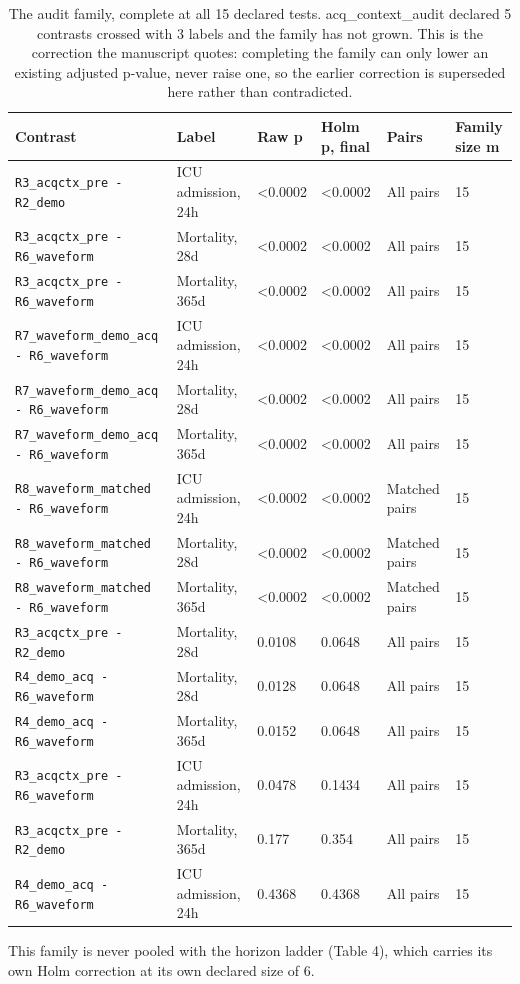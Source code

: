 \begin{table}[t]
\centering
\small
\caption{The audit family, complete at all 15 declared tests. acq\_context\_audit declared 5 contrasts crossed with 3 labels and the family has not grown. This is the correction the manuscript quotes: completing the family can only lower an existing adjusted p-value, never raise one, so the earlier correction is superseded here rather than contradicted.}
\label{tab:family}
\begin{tabular}{llllll}
\toprule
Contrast & Label & Raw p & Holm p, final & Pairs & Family size m \\
\midrule
\texttt{R3\_acqctx\_pre - R2\_demo} & ICU admission, 24h & <0.0002 & <0.0002 & All pairs & 15 \\
\texttt{R3\_acqctx\_pre - R6\_waveform} & Mortality, 28d & <0.0002 & <0.0002 & All pairs & 15 \\
\texttt{R3\_acqctx\_pre - R6\_waveform} & Mortality, 365d & <0.0002 & <0.0002 & All pairs & 15 \\
\texttt{R7\_waveform\_demo\_acq - R6\_waveform} & ICU admission, 24h & <0.0002 & <0.0002 & All pairs & 15 \\
\texttt{R7\_waveform\_demo\_acq - R6\_waveform} & Mortality, 28d & <0.0002 & <0.0002 & All pairs & 15 \\
\texttt{R7\_waveform\_demo\_acq - R6\_waveform} & Mortality, 365d & <0.0002 & <0.0002 & All pairs & 15 \\
\texttt{R8\_waveform\_matched - R6\_waveform} & ICU admission, 24h & <0.0002 & <0.0002 & Matched pairs & 15 \\
\texttt{R8\_waveform\_matched - R6\_waveform} & Mortality, 28d & <0.0002 & <0.0002 & Matched pairs & 15 \\
\texttt{R8\_waveform\_matched - R6\_waveform} & Mortality, 365d & <0.0002 & <0.0002 & Matched pairs & 15 \\
\texttt{R3\_acqctx\_pre - R2\_demo} & Mortality, 28d & 0.0108 & 0.0648 & All pairs & 15 \\
\texttt{R4\_demo\_acq - R6\_waveform} & Mortality, 28d & 0.0128 & 0.0648 & All pairs & 15 \\
\texttt{R4\_demo\_acq - R6\_waveform} & Mortality, 365d & 0.0152 & 0.0648 & All pairs & 15 \\
\texttt{R3\_acqctx\_pre - R6\_waveform} & ICU admission, 24h & 0.0478 & 0.1434 & All pairs & 15 \\
\texttt{R3\_acqctx\_pre - R2\_demo} & Mortality, 365d & 0.177 & 0.354 & All pairs & 15 \\
\texttt{R4\_demo\_acq - R6\_waveform} & ICU admission, 24h & 0.4368 & 0.4368 & All pairs & 15 \\
\bottomrule
\end{tabular}
\par\footnotesize This family is never pooled with the horizon ladder (Table 4), which carries its own Holm correction at its own declared size of 6.
\end{table}


